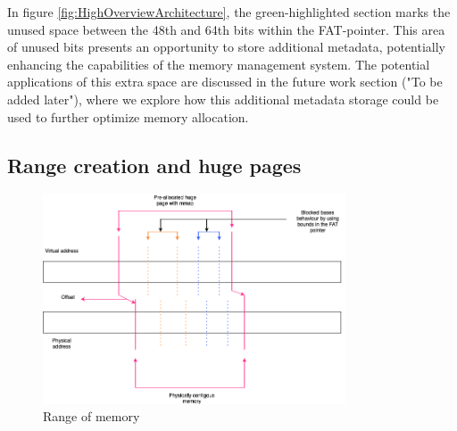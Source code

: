 In figure \ref{fig:HighOverviewArchitecture}, the green-highlighted section marks the unused space between the 48th and 64th bits
within the FAT-pointer. This area of unused bits presents an opportunity to store additional metadata,
potentially enhancing the capabilities of the memory management system. The potential applications of 
this extra space are discussed in the future work section ("To be added later"), 
where we explore how this additional metadata storage could be used to further optimize memory allocation.



\subsection{Range creation and huge pages}
\begin{figure}[h]
  \includegraphics[width=0.8\textwidth]{diagrams/AllocationOverview24.png}
  \caption{Range of memory}
  \label{fig:RangeOfMemory}
\end{figure}


